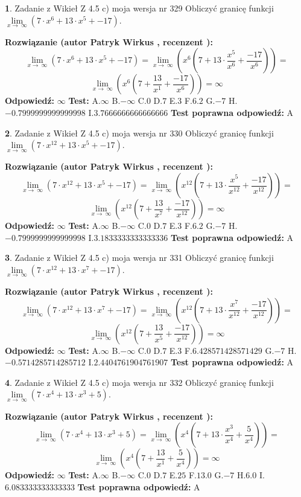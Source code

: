 \documentclass[12pt, a4paper]{article}
\theoremstyle{definition} %
\newtheorem{zad}{}
\newcommand{\zadStart}[1]{\begin{zad}#1\newline}
\newcommand{\zadStop}{\end{zad}}
\newcommand{\rozwStart}[2]{\noindent \textbf{Rozwiązanie (autor #1 , recenzent #2): }\newline}
\newcommand{\rozwStop}{\newline}
\newcommand{\odpStart}{\noindent \textbf{Odpowiedź:}\newline}
\newcommand{\odpStop}{\newline}
\newcommand{\testStart}{\noindent \textbf{Test:}\newline}
\newcommand{\testStop}{\newline}
\newcommand{\kluczStart}{\noindent \textbf{Test poprawna odpowiedź:}\newline}
\newcommand{\kluczStop}{\newline}
\begin{document}
\zadStart{Zadanie z Wikieł Z 4.5 c) moja wersja nr 329}
Obliczyć granicę funkcji  $\lim\limits_{x\to\ \infty}(7 \cdot x^{6}+13 \cdot x^{5}+-17)$.
\zadStop
\rozwStart{Patryk Wirkus}{}
$$\lim\limits_{x\to\ \infty}(7 \cdot x^{6}+13 \cdot x^{5}+-17) = \lim\limits_{x\to\ \infty}(x^{6}(7 +13 \cdot \frac{x^{5}}{x^{6}}+\frac{-17}{x^{6}})) =$$ $$\lim\limits_{x\to\ \infty}(x^{6}(7 +\frac{13}{x^{1}}+\frac{-17}{x^{6}})) =\infty$$
\rozwStop
\odpStart
$\infty$
\odpStop
\testStart
A.$\infty$ B.$-\infty$ C.$0$ D.$7$ E.$3$
F.$6.2$ G.$-7$
H.$-0.7999999999999998$
I.$3.7666666666666666$
\testStop
\kluczStart
A
\kluczStop



\zadStart{Zadanie z Wikieł Z 4.5 c) moja wersja nr 330}
Obliczyć granicę funkcji  $\lim\limits_{x\to\ \infty}(7 \cdot x^{12}+13 \cdot x^{5}+-17)$.
\zadStop
\rozwStart{Patryk Wirkus}{}
$$\lim\limits_{x\to\ \infty}(7 \cdot x^{12}+13 \cdot x^{5}+-17) = \lim\limits_{x\to\ \infty}(x^{12}(7 +13 \cdot \frac{x^{5}}{x^{12}}+\frac{-17}{x^{12}})) =$$ $$\lim\limits_{x\to\ \infty}(x^{12}(7 +\frac{13}{x^{7}}+\frac{-17}{x^{12}})) =\infty$$
\rozwStop
\odpStart
$\infty$
\odpStop
\testStart
A.$\infty$ B.$-\infty$ C.$0$ D.$7$ E.$3$
F.$6.2$ G.$-7$
H.$-0.7999999999999998$
I.$3.1833333333333336$
\testStop
\kluczStart
A
\kluczStop



\zadStart{Zadanie z Wikieł Z 4.5 c) moja wersja nr 331}
Obliczyć granicę funkcji  $\lim\limits_{x\to\ \infty}(7 \cdot x^{12}+13 \cdot x^{7}+-17)$.
\zadStop
\rozwStart{Patryk Wirkus}{}
$$\lim\limits_{x\to\ \infty}(7 \cdot x^{12}+13 \cdot x^{7}+-17) = \lim\limits_{x\to\ \infty}(x^{12}(7 +13 \cdot \frac{x^{7}}{x^{12}}+\frac{-17}{x^{12}})) =$$ $$\lim\limits_{x\to\ \infty}(x^{12}(7 +\frac{13}{x^{5}}+\frac{-17}{x^{12}})) =\infty$$
\rozwStop
\odpStart
$\infty$
\odpStop
\testStart
A.$\infty$ B.$-\infty$ C.$0$ D.$7$ E.$3$
F.$6.428571428571429$ G.$-7$
H.$-0.5714285714285712$
I.$2.4404761904761907$
\testStop
\kluczStart
A
\kluczStop



\zadStart{Zadanie z Wikieł Z 4.5 c) moja wersja nr 332}
Obliczyć granicę funkcji  $\lim\limits_{x\to\ \infty}(7 \cdot x^{4}+13 \cdot x^{3}+5)$.
\zadStop
\rozwStart{Patryk Wirkus}{}
$$\lim\limits_{x\to\ \infty}(7 \cdot x^{4}+13 \cdot x^{3}+5) = \lim\limits_{x\to\ \infty}(x^{4}(7 +13 \cdot \frac{x^{3}}{x^{4}}+\frac{5}{x^{4}})) =$$ $$\lim\limits_{x\to\ \infty}(x^{4}(7 +\frac{13}{x^{1}}+\frac{5}{x^{4}})) =\infty$$
\rozwStop
\odpStart
$\infty$
\odpStop
\testStart
A.$\infty$ B.$-\infty$ C.$0$ D.$7$ E.$25$
F.$13.0$ G.$-7$
H.$6.0$
I.$6.083333333333333$
\testStop
\kluczStart
A
\kluczStop
\end{document}
